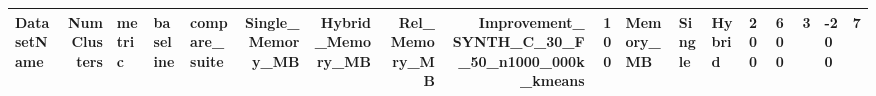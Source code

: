 \begin{tabular}{lrlllrrrrr}
\toprule
DatasetName & NumClusters & metric & baseline & compare_suite & Single_Memory_MB & Hybrid_Memory_MB & Rel_Memory_MB & Improvement_%
\midrule
SYNTH_C_30_F_50_n1000_000k_kmeans & 100 & Memory_MB & Single & Hybrid & 200 & 600 & 3 & -200 & 7 \\
\bottomrule
\end{tabular}
